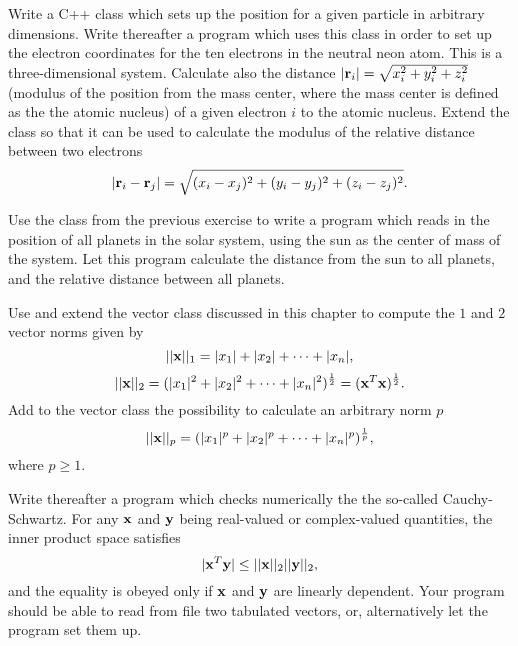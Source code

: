 \begin{prob}
Write a C++ class which sets up the position for a given particle in arbitrary dimensions.
Write thereafter a program which uses this class in order to set up the electron coordinates 
for the ten electrons in the neutral neon atom. This is a three-dimensional system.
Calculate also the distance $|{\bf r}_i|=\sqrt{x_i^2+y_i^2+z_i^2}$ (modulus of the position from the mass center, where the mass center is defined as the the atomic nucleus)
of a given electron $i$ to the atomic nucleus. Extend the class so that it can be used to calculate the modulus
of the relative distance between two electrons
\[
|{\bf r}_i-{\bf r}_j|=\sqrt{(x_i-x_j)^2+(y_i-y_j)^2+(z_i-z_j)^2}.
\] 
\end{prob}


\begin{prob}
Use the class from the previous exercise to write a program which reads in the position of all planets in the solar system, using the sun as the center of mass of the system.
Let this program calculate the distance from the sun to all planets, and the relative distance between all planets.
\end{prob}


\begin{prob}
Use and extend the vector class discussed in this chapter 
to compute the 
$1$ and $2$ vector norms given by
\[
 ||{\bf x}||_1 = |x_1|+|x_2|+\dots + |x_n|,
\]
\[
||{\bf x}||_2 = (|x_1|^2+|x_2|^2+\dots + |x_n|^2)^{\frac{1}{2}}=({\bf x}^T{\bf x})^{\frac{1}{2}}.
\]
Add to the vector class the possibility to calculate an arbitrary norm $p$
\[
||{\bf x}||_p = (|x_1|^p+|x_2|^p+\dots + |x_n|^p)^{\frac{1}{p}},
\] 
where $p \ge 1$. 

Write thereafter a program which checks numerically the
the so-called Cauchy-Schwartz. For any ${\bf x}$ and ${\bf y}$ being 
real-valued or complex-valued quantities, the  inner product space satisfies
\[
   |{\bf x}^T{\bf y}| \le ||{\bf x}||_2||{\bf y}||_2,
\]
and the equality is obeyed only if ${\bf x}$ and ${\bf y}$ are linearly dependent. 
Your program
should be able to read from file two tabulated vectors, or, alternatively let the program
set them up.
\end{prob}




